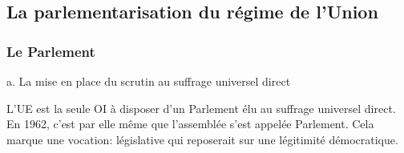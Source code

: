 \documentclass[12pt, a4paper, openany]{book}
\begin{document}
\subsection{La parlementarisation du régime de l'Union}

\subsubsection{Le Parlement}

a. La mise en place du scrutin au suffrage universel direct


L'UE est la seule OI à disposer d'un Parlement élu au suffrage universel direct. \\
En 1962, c'est par elle même que l'assemblée s'est appelée Parlement. Cela marque une vocation: législative qui reposerait sur une légitimité démocratique.
\end{document}
